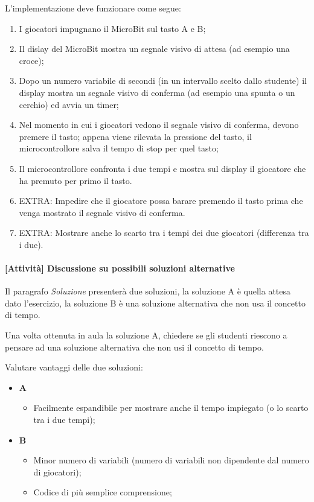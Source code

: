 \documentclass[../../docenti.tex]{subfiles}
\begin{document}
L'implementazione deve funzionare come segue:
\begin{enumerate}
	\item I giocatori impugnano il MicroBit sul tasto A e B;
	\item Il dislay del MicroBit mostra un segnale visivo di attesa (ad esempio una croce);
	\item Dopo un numero variabile di secondi (in un intervallo scelto dallo studente) il display mostra un segnale visivo di conferma (ad esempio una spunta o un cerchio) ed avvia un timer;
	\item Nel momento in cui i giocatori vedono il segnale visivo di conferma, devono premere il tasto; appena viene rilevata la pressione del tasto, il microcontrollore salva il tempo di stop per quel tasto;
	\item Il microcontrollore confronta i due tempi e mostra sul display il giocatore che ha premuto per primo il tasto.
	\item EXTRA: Impedire che il giocatore possa barare premendo il tasto prima che venga mostrato il segnale visivo di conferma.
	\item EXTRA: Mostrare anche lo scarto tra i tempi dei due giocatori (differenza tra i due).
\end{enumerate}

\paragraph{[Attività] Discussione su possibili soluzioni alternative}
Il paragrafo \textit{Soluzione} presenterà due soluzioni, la soluzione A è quella attesa dato l'esercizio, la soluzione B è una soluzione alternativa che non usa il concetto di tempo.

Una volta ottenuta in aula la soluzione A, chiedere se gli studenti riescono a pensare ad una soluzione alternativa che non usi il concetto di tempo.

Valutare vantaggi delle due soluzioni:
\begin{itemize}
	\item \textbf{A}
	\begin{itemize}
		\item Facilmente espandibile per mostrare anche il tempo impiegato (o lo scarto tra i due tempi);
	\end{itemize}
	\item \textbf{B}
	\begin{itemize}
		\item Minor numero di variabili (numero di variabili non dipendente dal numero di giocatori);
		\item Codice di più semplice comprensione;
	\end{itemize}
\end{itemize}
\end{document}
